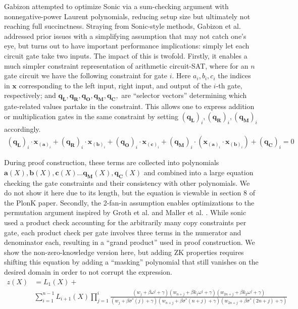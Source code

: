 \noindent Gabizon \cite{auroralight} attempted to optimize Sonic via a sum-checking argument with nonnegative-power Laurent polynomials, reducing setup size but ultimately not reaching full succinctness. Straying from Sonic-style methods, Gabizon et al. \cite{plonk} addressed prior issues with a simplifying assumption that may not catch one's eye, but turns out to have important performance implications: simply let each circuit gate take two inputs. The impact of this is twofold. Firstly, it enables a much simpler constraint representation of arithmetic circuit-SAT, where for an $n$ gate circuit we have the following constraint for gate $i$. Here $a_i, b_i, c_i$ the indices in $\mathbf{x}$ corresponding to the left input, right input, and output of the $i$-th gate, respectively; and $\mathbf{q_L}, \mathbf{q_R},\mathbf{q_O},\mathbf{q_M},\mathbf{q_C},$ are ``selector vectors'' determining which gate-related values partake in the constraint. This allows one to express addition or multiplication gates in the same constraint by setting $(\mathbf{q_L})_i, (\mathbf{q_R})_i, (\mathbf{q_M})_i$ accordingly. 
\begin{align}
(\mathbf{q_L})_i \cdot \mathbf{x}_{(\mathbf{a})_i} + (\mathbf{q_R})_i \cdot \mathbf{x}_{(\mathbf{b})_i} + (\mathbf{q_O})_i \cdot \mathbf{x}_{(\mathbf{c})_i} + (\mathbf{q_M})_i \cdot (\mathbf{x}_{(\mathbf{a})_i} \cdot \mathbf{x}_{(\mathbf{b})_i}) + (\mathbf{q_C})_i = 0
\end{align}


\noindent During proof construction, these terms are collected into polynomials $\mathbf{a}(X), \mathbf{b}(X), \mathbf{c}(X) \dots \mathbf{q_M}(X), \mathbf{q_C}(X)$ and combined into a large equation checking the gate constraints and their consistency with other polynomials. We do not show it here due to its length, but the equation is viewable in section 8 of the PlonK paper. Secondly, the 2-fan-in assumption enables optimizations to the permutation argument inspired by Groth et al. and Maller et al. \cite{grothshuffle, sonic}. While sonic used a product check accounting for the arbitrarily many copy constraints per gate, each product check per gate involves three terms in the numerator and denominator each, resulting in a ``grand product'' used in proof construction. We show the non-zero-knowledge version here, but adding ZK properties requires shifting this equation by adding a ``masking'' polynomial that still vanishes on the desired domain in order to not corrupt the expression.
\begin{align}
    z(X) &= L_1(X) + \\
    &\sum_{i=1}^{n-1} L_{i+1}(X) \prod_{j=1}^{i} \frac{(w_j + \beta\omega^j + \gamma)(w_{n+j} + \beta k_1\omega^j + \gamma)(w_{2n+j} + \beta k_2\omega^j + \gamma)}{(w_j + \beta\sigma^*(j) + \gamma)(w_{n+j} + \beta\sigma^*(n+j) + \gamma)(w_{2n+j} + \beta\sigma^*(2n+j) + \gamma)}
\end{align}

